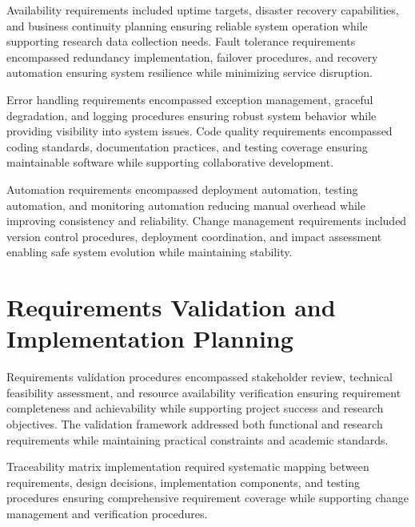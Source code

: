 
Availability requirements included uptime targets, disaster recovery capabilities, and business continuity planning ensuring reliable system operation while supporting research data collection needs. Fault tolerance requirements encompassed redundancy implementation, failover procedures, and recovery automation ensuring system resilience while minimizing service disruption.

Error handling requirements encompassed exception management, graceful degradation, and logging procedures ensuring robust system behavior while providing visibility into system issues. Code quality requirements encompassed coding standards, documentation practices, and testing coverage ensuring maintainable software while supporting collaborative development.

Automation requirements encompassed deployment automation, testing automation, and monitoring automation reducing manual overhead while improving consistency and reliability. Change management requirements included version control procedures, deployment coordination, and impact assessment enabling safe system evolution while maintaining stability.

\section{Requirements Validation and Implementation Planning}

Requirements validation procedures encompassed stakeholder review, technical feasibility assessment, and resource availability verification ensuring requirement completeness and achievability while supporting project success and research objectives. The validation framework addressed both functional and research requirements while maintaining practical constraints and academic standards.

Traceability matrix implementation required systematic mapping between requirements, design decisions, implementation components, and testing procedures ensuring comprehensive requirement coverage while supporting change management and verification procedures.


